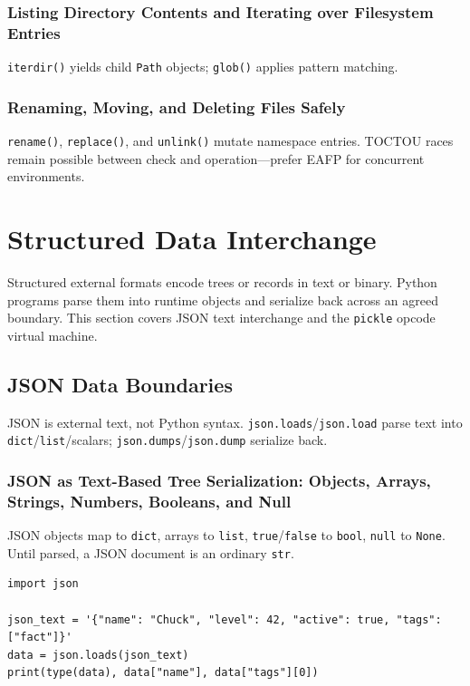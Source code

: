 \documentclass[a4paper,twoside]{report}
\begin{document}
\subsubsection{Listing Directory Contents and Iterating over Filesystem Entries}

\texttt{iterdir()} yields child \texttt{Path} objects; \texttt{glob()} applies pattern matching.

\subsubsection{Renaming, Moving, and Deleting Files Safely}

\texttt{rename()}, \texttt{replace()}, and \texttt{unlink()} mutate namespace entries. TOCTOU races remain possible between check and operation---prefer EAFP for concurrent environments.


\section{Structured Data Interchange}

Structured external formats encode trees or records in text or binary. Python programs parse them into runtime objects and serialize back across an agreed boundary. This section covers JSON text interchange and the \texttt{pickle} opcode virtual machine.


\subsection{JSON Data Boundaries}

JSON is external text, not Python syntax. \texttt{json.loads}/\texttt{json.load} parse text into \texttt{dict}/\texttt{list}/scalars; \texttt{json.dumps}/\texttt{json.dump} serialize back.

\subsubsection{JSON as Text-Based Tree Serialization: Objects, Arrays, Strings, Numbers, Booleans, and Null}

JSON objects map to \texttt{dict}, arrays to \texttt{list}, \texttt{true}/\texttt{false} to \texttt{bool}, \texttt{null} to \texttt{None}. Until parsed, a JSON document is an ordinary \texttt{str}.

\begin{verbatim}
import json

json_text = '{"name": "Chuck", "level": 42, "active": true, "tags": ["fact"]}'
data = json.loads(json_text)
print(type(data), data["name"], data["tags"][0])
\end{verbatim}
\end{document}
